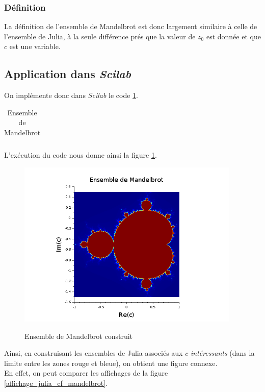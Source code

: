 \documentclass[a4paper,10pt]{report}
\begin{document}
\subsubsection{Définition}
La définition de l'ensemble de Mandelbrot est donc largement similaire à celle de l'ensemble de Julia, à la seule différence prés que la valeur de $z_0$ est donnée et que $c$ est une variable.

\subsection{Application dans \textit{Scilab}}
On implémente donc dans \textit{Scilab} le code \ref{code_mandelbrot}.

\begin{table}[H]
\caption{Ensemble de Mandelbrot}
\begin{tabular}{l}
\\
\end{tabular}
\label{code_mandelbrot}
\end{table}

L'exécution du code nous donne ainsi la figure \ref{affichage_mandelbrot}.
\begin{figure}[H]
\caption{Ensemble de Mandelbrot construit}
\centering
\includegraphics[height=8cm]{mandelbrot1.png}
\label{affichage_mandelbrot}
\end{figure}
Ainsi, en construisant les ensembles de Julia associés aux $c$ \textit{intéressants} (dans la limite entre les zones rouge et bleue), on obtient une figure connexe.\\
\indent En effet, on peut comparer les affichages de la figure \ref{affichage_julia_cf_mandelbrot}.
\end{document}
